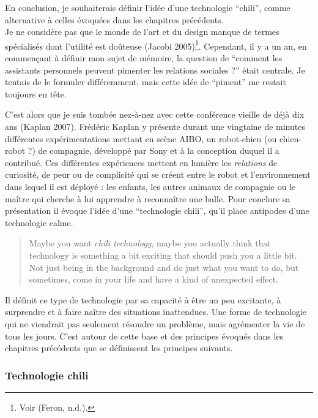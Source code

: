 \documentclass[]{article}
\begin{document}
En conclusion, je souhaiterais définir l'idée d'une technologie
``chili'', comme alternative à celles évoquées dans les chapitres
précédents.\\
Je ne considère pas que le monde de l'art et du design manque de termes
spécialisés dont l'utilité est doûteuse (Jacobi 2005)\footnote{Voir
  (Feron, n.d.).}. Cependant, il y a un an, en commençant à définir mon
sujet de mémoire, la question de ``comment les assistants personnels
peuvent pimenter les relations sociales ?'' était centrale. Je tentais
de le formuler différemment, mais cette idée de ``piment'' me restait
toujours en tête.

C'est alors que je suis tombée nez-à-nez avec cette conférence vieille
de déjà dix ans (Kaplan 2007). Frédéric Kaplan y présente durant une
vingtaine de minutes différentes expérimentations mettant en scène AIBO,
un robot-chien (ou chien-robot ?) de compagnie, développé par Sony et à
la conception duquel il a contribué. Ces différentes expériences mettent
en lumière les \emph{relations} de curiosité, de peur ou de complicité
qui se créent entre le robot et l'environnement dans lequel il est
déployé : les enfants, les autres animaux de compagnie ou le maître qui
cherche à lui apprendre à reconnaître une balle. Pour conclure sa
présentation il évoque l'idée d'une ``technologie chili'', qu'il place
antipodes d'une technologie calme.

\begin{quote}
Maybe you want \emph{chili technology}, maybe you actually think that
technology is something a bit exciting that should push you a little
bit. Not just being in the background and do just what you want to do,
but sometimes, come in your life and have a kind of unexpected effect.
\end{quote}

Il définit ce type de technologie par sa capacité à être un peu
excitante, à surprendre et à faire naître des situations inattendues.
Une forme de technologie qui ne viendrait pas seulement résoudre un
problème, mais agrémenter la vie de tous les jours. C'est autour de
cette base et des principes évoqués dans les chapitres précédents que se
définissent les principes suivants.

\newpage

\hypertarget{technologie-chili}{%
\subsubsection{Technologie chili}\label{technologie-chili}}
\end{document}
